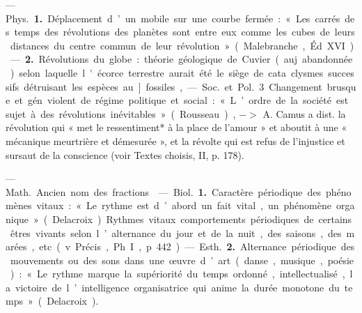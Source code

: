 \begin{itemize}[leftmargin=1cm, label=, itemsep=1pt]
 — \si{Phys.} {\bf 1.} Déplacement
d’un mobile sur une courbe fermée :
« Les carrés des temps des révolutions des planètes sont entre eux
comme les cubes de leurs distances
du centre commun de leur révolution » (Malebranche, Éd. XVI)
— {\bf 2.} Révolutions du globe : théorie
géologique de Cuvier (auj. abandonnée) selon laquelle l'écorce terrestre aurait été le siège de cata
clysmes successifs détruisant les
espèces au]. fossiles,

— \si{Soc.} et \si{Pol.} 3 Changement
brusque et gén. violent de régime
politique et social : « L’ordre de la
société est sujet à des révolutions
inévitables » (Rousseau), $->$
A. Camus a dist. la révolution qui
« met le ressentiment* à la place de
l'amour » et aboutit à une « mécanique meurtrière et démesurée », et
la révolte qui est refus de l'injustice
et sursaut de la conscience (voir
Textes choisis, II, p. 178).

 — \si{Math.} Ancien
nom des fractions.

 — \si{Biol.} {\bf 1.} Caractère périodique des phénomènes vitaux : « Le
rythme est d’abord un fait vital, un
phénomène organique » (Delacroix).
Rythmes vitaux comportements
périodiques de certains êtres vivants
selon l’alternance du jour et de la
nuit, des saisons, des marées, etc.
(v. Précis, Ph. I, p. 442).

— \si{Esth.} {\bf 2.} Alternance périodique des mouvements ou des sons
dans une œuvre d’art (danse, musique, poésie) : « Le rythme marque
la supériorité du temps ordonné,
intellectualisé, la victoire de l’intelligence organisatrice qui anime la
durée monotone du temps » (Delacroix).

	\end{itemize}
